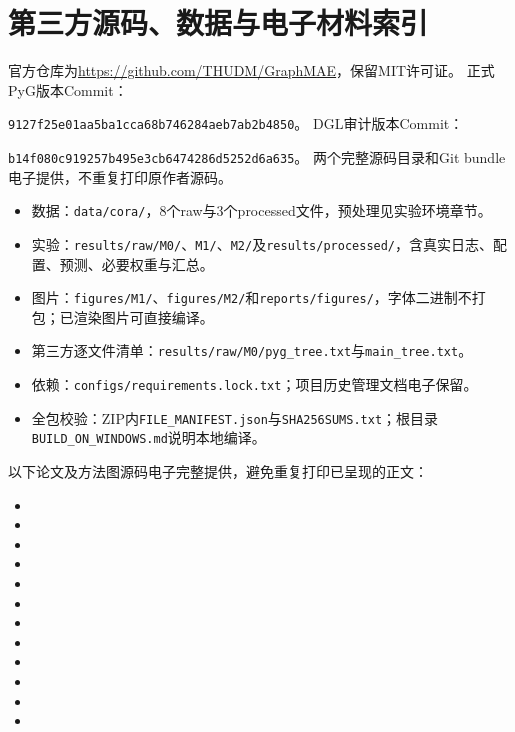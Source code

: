 \section{第三方源码、数据与电子材料索引}
官方仓库为\url{https://github.com/THUDM/GraphMAE}，保留MIT许可证。
正式PyG版本Commit：\par\noindent\texttt{9127f25e01aa5ba1cca68b746284aeb7ab2b4850}。
DGL审计版本Commit：\par\noindent\texttt{b14f080c919257b495e3cb6474286d5252d6a635}。
两个完整源码目录和Git bundle电子提供，不重复打印原作者源码。
\begin{itemize}
\item 数据：\texttt{data/cora/}，8个raw与3个processed文件，预处理见实验环境章节。
\item 实验：\texttt{results/raw/M0/}、\texttt{M1/}、\texttt{M2/}及\texttt{results/processed/}，含真实日志、配置、预测、必要权重与汇总。
\item 图片：\texttt{figures/M1/}、\texttt{figures/M2/}和\texttt{reports/figures/}，字体二进制不打包；已渲染图片可直接编译。
\item 第三方逐文件清单：\texttt{results/raw/M0/pyg\_tree.txt}与\texttt{main\_tree.txt}。
\item 依赖：\texttt{configs/requirements.lock.txt}；项目历史管理文档电子保留。
\item 全包校验：ZIP内\texttt{FILE\_MANIFEST.json}与\texttt{SHA256SUMS.txt}；根目录\texttt{BUILD\_ON\_WINDOWS.md}说明本地编译。
\end{itemize}
以下论文及方法图源码电子完整提供，避免重复打印已呈现的正文：
\begin{itemize}
\item \texttt{}
\item \texttt{}
\item \texttt{}
\item \texttt{}
\item \texttt{}
\item \texttt{}
\item \texttt{}
\item \texttt{}
\item \texttt{}
\item \texttt{}
\item \texttt{}
\item \texttt{}
\end{itemize}
